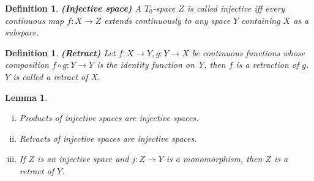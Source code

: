 \documentclass[a4paper,12pt]{article}
\newtheorem{lemma}[theorem]{Lemma}
\newtheorem{definition}[theorem]{Definition}
\begin{document}
\begin{definition}\textbf{(Injective space)}
A $T_0$-space $Z$ is called \emph{injective} iff every continuous map $f: X \rightarrow Z$ extends continuously to any space $Y$ containing $X$ as a subspace.
 \begin{center}
 \end{center}
\end{definition}
\begin{definition}\textbf{(Retract)}
Let $f: X\to Y, g: Y\to X$ be continuous functions whose composition $f\circ g: Y \to Y$ is the identity function on Y, then $f$ is a \emph{retraction} of $g$. $Y$ is called a \emph{retract} of \emph{X}.
\end{definition}
\begin{lemma}\label{karlakak}
\begin{enumerate}[(i)]
  \item Products of injective spaces are injective spaces.
  \item Retracts of injective spaces are injective spaces.
  \item If $Z$ is an injective space and $j: Z \to Y$ is a monomorphism, then $Z$ is a retract of $Y$.
\end{enumerate}
\end{lemma}
\end{document}
